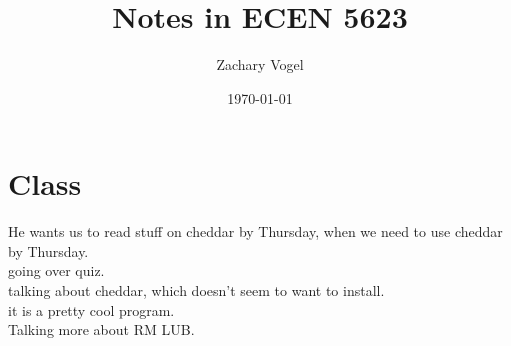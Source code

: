 \documentclass{article}
\author{Zachary Vogel}
\date{\today}
\title{Notes in ECEN 5623}
\begin{document}
\maketitle


\section*{Class}
He wants us to read stuff on cheddar by Thursday, when we need to use cheddar by Thursday.\\
going over quiz.\\

talking about cheddar, which doesn't seem to want to install.\\
it is a pretty cool program.\\

Talking more about RM LUB.\\
\end{document}
